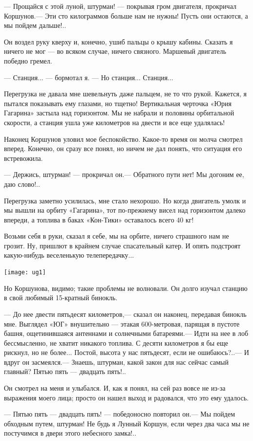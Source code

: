 \documentclass[11pt,a4paper,oneside]{article}
\begin{document}
— Прощайся с этой луной, штурман! — покрывая гром двигателя, прокричал Коршунов.— Эти сто килограммов больше нам не нужны! Пусть они остаются, а мы пойдем дальше!..

Он воздел руку кверху и, конечно, ушиб пальцы о крышу кабины. Сказать я ничего не мог — во всяком случае, ничего связного. Маршевый двигатель победно гремел.

— Станция... — бормотал я. — Но станция... Станция...

Перегрузка не давала мне шевельнуть даже пальцем, не то что рукой. Кажется, я пытался показывать ему глазами, но тщетно! Вертикальная черточка «Юрия Гагарина» застыла над горизонтом. Мы не набрали и половины орбитальной скорости, а станция ушла уже километров на двести и все еще удалялась!

Наконец Коршунов уловил мое беспокойство. Какое-то время он молча смотрел вперед. Конечно, он сразу все понял, но ничем не дал понять, что ситуация его встревожила.

— Держись, штурман! — прокричал он.— Обратного пути нет! Мы догоним ее, даю слово!..

Перегрузка заметно усилилась, мне стало нехорошо. Но когда двигатель умолк и мы вышли на орбиту «Гагарина», тот по-прежнему висел над горизонтом далеко впереди, а топлива в баках «Кон-Тики» оставалось всего 40 кг!

Возьми себя в руки, сказал я себе, мы на орбите, ничего страшного нам не грозит. Ну, пришлют в крайнем случае спасательный катер. И опять подстроят какую-нибудь веселенькую телепередачку...

\texttt{[image: ug1]}

Но Коршунова, видимо; такие проблемы не волновали. Он долго изучал станцию в свой любимый 15-кратный бинокль.

— До нее двести пятьдесят километров,— сказал он наконец, передавая бинокль мне. Выглядел «ЮГ» внушительно — этакая 600-метровая, парящая в пустоте башня, ощетинившаяся антеннами и солнечными батареями.— Идти на нее в лоб бессмысленно, не хватит никакого топлива. С десяти километров я бы еще рискнул, но не более... Постой, высота у нас пятьдесят, если не ошибаюсь?..— И вдруг он засмеялся.— Знаешь, штурман, какой закон для нас сейчас самый главный? Пятью пять — двадцать пять!..

Он смотрел на меня и улыбался. И, как я понял, на сей раз вовсе не из-за выражения моего лица; просто он нашел выход и радовался, что это ему удалось.

— Пятью пять — двадцать пять! — победоносно повторил он.— Мы пойдем обходным путем, штурман! Не будь я Лунный Коршун, если через два часа мы не постучимся в двери этого небесного замка!..
\end{document}
